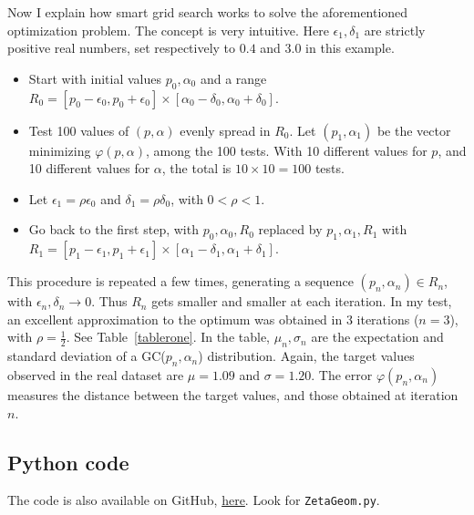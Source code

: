 \documentclass[oneside,10pt]{book}
\begin{document}
\noindent Now I explain how smart grid search works to solve the aforementioned optimization problem. The concept is very intuitive. Here $\epsilon_1, \delta_1$ are strictly positive real numbers, set respectively to $0.4$ and $3.0$ in this example. \vspace{1ex}
\begin{itemize}
 \item Start with initial values
 $p_0,\alpha_0$ and a range $R_0 = [p_0 - \epsilon_0, p_0+\epsilon_0] \times [\alpha_0 - \delta_0, \alpha_0+\delta_0]$.
\item Test
100 values of $(p,\alpha)$ evenly spread in $R_0$.
Let $(p_1,\alpha_1)$ be the vector minimizing $\varphi(p,\alpha)$, among the
 100 tests.
With 10 different values for $p$, and 10 different values for $\alpha$, the total is $10\times 10 = 100$ tests.
\item Let $\epsilon_1 = \rho \epsilon_0$ and $\delta_1 = \rho \delta_0$, with $0<\rho<1$.
\item Go back to the first step, with $p_0,\alpha_0, R_0$ replaced by $p_1,\alpha_1, R_1$
 with $R_1 = [p_1 - \epsilon_1, p_1+\epsilon_1] \times [\alpha_1 - \delta_1, \alpha_1+\delta_1]$.
\end{itemize}\vspace{1ex}
This procedure is repeated a few times, generating a sequence $(p_n,\alpha_n)\in R_n$, with $\epsilon_n, \delta_n \rightarrow 0$.
 Thus $R_n$ gets smaller and smaller at each iteration. In my test, an excellent approximation to the optimum was
 obtained in 3 iterations ($n=3$), with $\rho=\frac{1}{2}$. See Table~\ref{tablerone}. In the table, $\mu_n,\sigma_n$ are the
 expectation and standard deviation of a GC($p_n,\alpha_n$) distribution. Again, the target
 values observed in the real dataset are $\mu=1.09$ and $\sigma = 1.20$. The error $\varphi(p_n,\alpha_n)$ measures
 the distance between the target values, and those obtained at iteration $n$.







\subsection{Python code}\label{mangeputy}

The code is also available on GitHub,
 \href{https://github.com/VincentGranville/Statistical-Optimization/blob/main/ZetaGeom.py}{here}.
Look for \texttt{ZetaGeom.py}.
\vspace{1ex}
\end{document}

